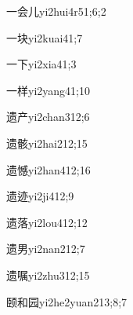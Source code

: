 \begin{verbete}{一会儿}{yi2hui4r5}{1;6;2}
\end{verbete}

\begin{verbete}{一块}{yi2kuai4}{1;7}
\end{verbete}

\begin{verbete}{一下}{yi2xia4}{1;3}
\end{verbete}

\begin{verbete}{一样}{yi2yang4}{1;10}
\end{verbete}

\begin{verbete}{遗产}{yi2chan3}{12;6}
\end{verbete}

\begin{verbete}{遗骸}{yi2hai2}{12;15}
\end{verbete}

\begin{verbete}{遗憾}{yi2han4}{12;16}
\end{verbete}

\begin{verbete}{遗迹}{yi2ji4}{12;9}
\end{verbete}

\begin{verbete}{遗落}{yi2lou4}{12;12}
\end{verbete}

\begin{verbete}{遗男}{yi2nan2}{12;7}
\end{verbete}

\begin{verbete}{遗嘱}{yi2zhu3}{12;15}
\end{verbete}

\begin{verbete}{颐和园}{yi2he2yuan2}{13;8;7}
\end{verbete}

